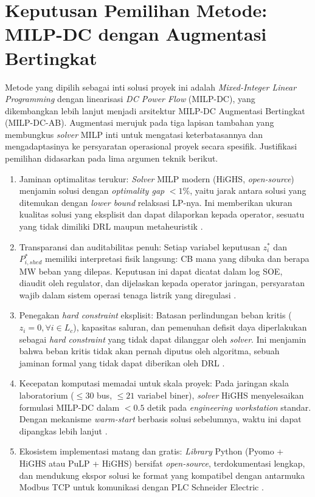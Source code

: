 \section{Keputusan Pemilihan Metode: MILP-DC dengan Augmentasi Bertingkat}
\label{sec:Keputusan_Pemilihan_Metode}

Metode yang dipilih sebagai inti solusi proyek ini adalah \textit{Mixed-Integer Linear Programming} dengan linearisasi \textit{DC Power Flow} (MILP-DC), yang dikembangkan lebih lanjut menjadi arsitektur MILP-DC Augmentasi Bertingkat (MILP-DC-AB). Augmentasi merujuk pada tiga lapisan tambahan yang membungkus \textit{solver} MILP inti untuk mengatasi keterbatasannya dan mengadaptasinya ke persyaratan operasional proyek secara spesifik. Justifikasi pemilihan didasarkan pada lima argumen teknik berikut.

\begin{enumerate}
    \item[a.] Jaminan optimalitas terukur: \textit{Solver} MILP modern (HiGHS, \textit{open-source}) menjamin solusi dengan \textit{optimality gap} $<1\%$, yaitu jarak antara solusi yang ditemukan dengan \textit{lower bound} relaksasi LP-nya. Ini memberikan ukuran kualitas solusi yang eksplisit dan dapat dilaporkan kepada operator, sesuatu yang tidak dimiliki DRL maupun metaheuristik \cite{Sarwar2020, Wolsey2021}.
    \item[b.] Transparansi dan auditabilitas penuh: Setiap variabel keputusan $z_{i}^{*}$ dan $P_{i,shed}^{*}$ memiliki interpretasi fisik langsung: CB mana yang dibuka dan berapa MW beban yang dilepas. Keputusan ini dapat dicatat dalam log SOE, diaudit oleh regulator, dan dijelaskan kepada operator jaringan, persyaratan wajib dalam sistem operasi tenaga listrik yang diregulasi \cite{Babagana2025}.
    \item[c.] Penegakan \textit{hard constraint} eksplisit: Batasan perlindungan beban kritis ($z_{i}=0,\forall i\in L_c$), kapasitas saluran, dan pemenuhan defisit daya diperlakukan sebagai \textit{hard constraint} yang tidak dapat dilanggar oleh \textit{solver}. Ini menjamin bahwa beban kritis tidak akan pernah diputus oleh algoritma, sebuah jaminan formal yang tidak dapat diberikan oleh DRL \cite{Arenas2026}.
    \item[d.] Kecepatan komputasi memadai untuk skala proyek: Pada jaringan skala laboratorium ($\le 30$ bus, $\le 21$ variabel biner), \textit{solver} HiGHS menyelesaikan formulasi MILP-DC dalam $< 0.5$ detik pada \textit{engineering workstation} standar. Dengan mekanisme \textit{warm-start} berbasis solusi sebelumnya, waktu ini dapat dipangkas lebih lanjut \cite{Sarwar2020, Sarwar2022}.
    \item[e.] Ekosistem implementasi matang dan gratis: \textit{Library} Python (Pyomo + HiGHS atau PuLP + HiGHS) bersifat \textit{open-source}, terdokumentasi lengkap, dan mendukung ekspor solusi ke format yang kompatibel dengan antarmuka Modbus TCP untuk komunikasi dengan PLC Schneider Electric \cite{HiGHS}.
\end{enumerate}

